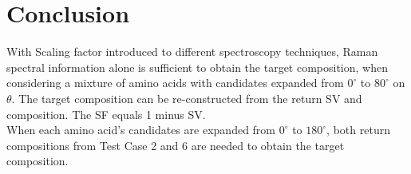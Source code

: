 \section{Conclusion}

With Scaling factor introduced to different spectroscopy techniques, Raman spectral information alone is sufficient to obtain the target composition, when considering a mixture of amino acids with candidates expanded from $0^{\circ}$ to $80^{\circ}$ on $\theta$. The target composition can be re-constructed from the return SV and composition. The SF equals 1 minus SV. \\

When each amino acid's candidates are expanded from $0^{\circ}$ to $180^{\circ}$, both return compositions from Test Case 2 and 6 are needed to obtain the target composition. \\
